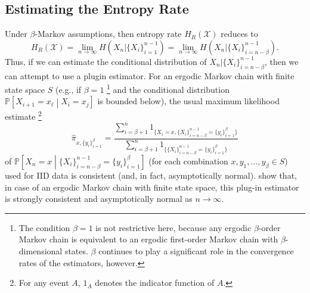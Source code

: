 \documentclass{article} %
\newcommand{\X}{\mathcal{X}}                        %
\newcommand{\pr}{\mathbb{P}}                        %
\renewcommand{\hat}{\widehat}
\begin{document}
\subsection{Estimating the Entropy Rate}
Under $\beta$-Markov assumptions, then entropy rate $H_R(\X)$ reduces to
\begin{equation}
H_R(\X)
    = \lim_{n \to \infty} H(X_n | \{X_i\}_{i = 1}^{n - 1})
    = \lim_{n \to \infty} H(X_n | \{X_i\}_{i = n - \beta}^{n - 1}).
\label{eq:reduced_HR}
\end{equation}
Thus, if we can estimate the conditional distribution of
$X_n | \{X_i\}_{i = n - \beta}^{n - 1}$, then we can attempt to use a plugin
estimator. For an ergodic Markov chain with finite state space $S$ (e.g., if
$\beta = 1$
\footnote{The condition $\beta = 1$ is not restrictive here, because any
ergodic $\beta$-order Markov chain is equivalent to an ergodic first-order
Markov chain with $\beta$-dimensional states. $\beta$ continues to play a
significant role in the convergence rates of the estimators, however.}
and the conditional distribution
$\pr\left[ X_{i + 1} = x_\ell \middle| X_i = x_j \right]$ is bounded below),
the usual maximum likelihood estimate
\footnote{For any event $A$, $1_A$ denotes the indicator function of $A$.}
\[\hat \pi_{x,\{y_i\}_{i = 1}^\beta}
    =   \frac{\sum_{i = \beta + 1}^n 1_{\{X_i = x,
            \{X_i\}_{i = n - \beta}^{n - 1} = \{y_i\}_{i = 1}^{\beta}\}}}
        {\sum_{i = \beta + 1}^n
        1_{\{\{X_i\}_{i = n - \beta}^{n - 1} = \{y_i\}_{i = 1}^{\beta}\}}}
\]
of $\pr\left[ X_n = x
    \middle| \{X_i\}_{i = n - \beta}^{n - 1} = \{y_i\}_{i = 1}^{\beta} \right]$
(for each combination $x,y_1,\dots,y_\beta \in S$) used for IID data is
consistent (and, in fact, asymptotically normal). \cite{ciuperca05entropyRate}
show that, in case of an ergodic Markov chain with finite state space, this
plug-in estimator is strongly consistent and asymptotically normal as
$n \to \infty$.
\end{document}
